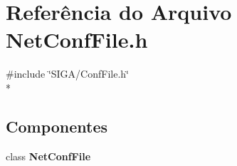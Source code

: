\section{Referência do Arquivo Net\+Conf\+File.\+h}
\label{_net_conf_file_8h}
{\ttfamily \#include \char`\"{}S\+I\+G\+A/\+Conf\+File.\+h\char`\"{}}\\*
\subsection*{Componentes}
\begin{DoxyCompactItemize}
\item 
class {\bf Net\+Conf\+File}
\end{DoxyCompactItemize}
